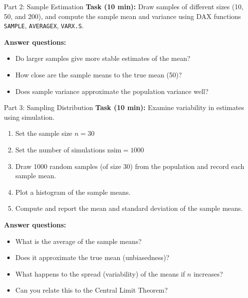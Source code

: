 \documentclass[main.tex]{subfiles}
\begin{document}
\begin{frame}
\begin{block}{Part 2: Sample Estimation}
\textbf{Task (10 min):} Draw samples of different sizes (10, 50, and 200), and compute the sample mean and variance using DAX functions \texttt{SAMPLE}, \texttt{AVERAGEX}, \texttt{VARX.S}.

\textbf{Answer questions:}
\begin{itemize}
  \item Do larger samples give more stable estimates of the mean?
  \item How close are the sample means to the true mean (50)?
  \item Does sample variance approximate the population variance well?
\end{itemize}
\end{block}
\end{frame}


\begin{frame}[fragile]
\begin{block}{Part 3: Sampling Distribution}
\textbf{Task (10 min):} Examine variability in estimates using simulation.
\begin{enumerate}\small
  \item Set the sample size $n=30$
  \item Set the number of simulations $\text{nsim} = 1000$
  \item Draw 1000 random samples (of size 30) from the population and record each sample mean.
  \item Plot a histogram of the sample means.
  \item Compute and report the mean and standard deviation of the sample means.
\end{enumerate}

\textbf{Answer questions:}
\begin{itemize}\small
  \item What is the average of the sample means?
  \item Does it approximate the true mean (unbiasedness)?
  \item What happens to the spread (variability) of the means if $n$ increases?
  \item Can you relate this to the Central Limit Theorem?
\end{itemize}
\end{block}
\end{frame}
\end{document}
